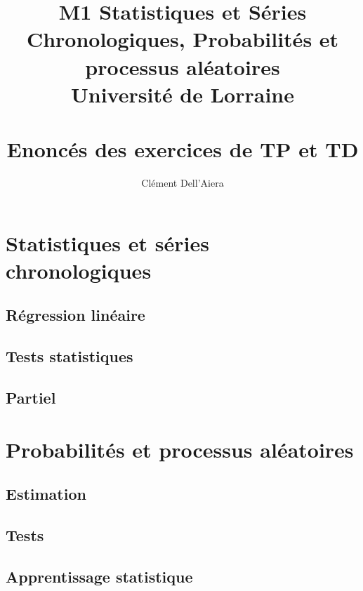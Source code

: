 \documentclass[a4paper]{report}
\title{M1 Statistiques et Séries Chronologiques, Probabilités et processus aléatoires  \\ Université de Lorraine \\ ~ \\
\textbf{Enoncés des exercices de TP et TD}}
\date{} %
\author{ Clément Dell'Aiera }
\begin{document}
  

\maketitle
\tableofcontents

\part{Statistiques et séries chronologiques}
\chapter{Régression linéaire}



\chapter{Tests statistiques}





\chapter{Partiel}



\part{Probabilités et processus aléatoires}

\chapter{Estimation}








%

\chapter{Tests}



\chapter{Apprentissage statistique}







\nocite{*}
\end{document}
